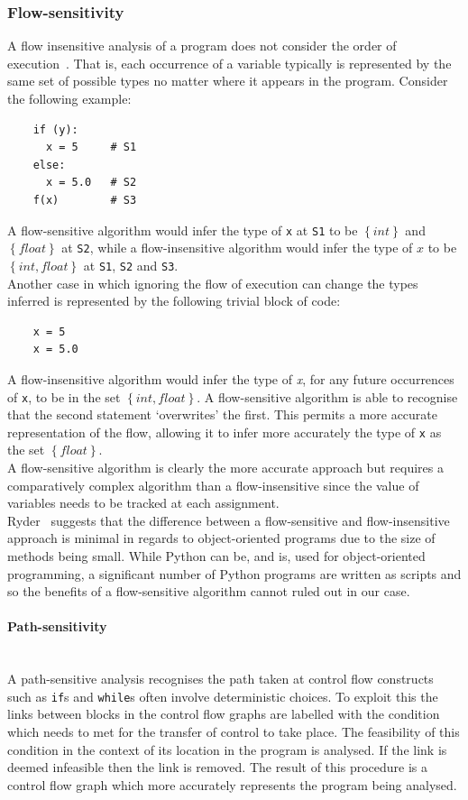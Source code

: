 \documentclass[12pt, titlepage]{article}
\begin{document}
\subsubsection{Flow-sensitivity}
A flow insensitive analysis of a program does not consider the order of execution~\cite{nielson99}. That is, each occurrence of a variable typically is represented by the same set of possible types no matter where it appears in the program. Consider the following example:
\begin{lstlisting}
    if (y):	
      x = 5     # S1
    else:
      x = 5.0   # S2
    f(x)        # S3
\end{lstlisting}
A flow-sensitive algorithm would infer the type of \texttt{x} at \texttt{S1} to be $\left\{ {int}\right\}$ and $\left\{ {float}\right\}$ at \texttt{S2}, while a flow-insensitive algorithm would infer the type of $x$ to be $\left\{ {int, float}\right\}$ at \texttt{S1}, \texttt{S2} and \texttt{S3}. \\
\indent Another case in which ignoring the flow of execution can change the types inferred is represented by the following trivial block of code:
\begin{lstlisting}
    x = 5
    x = 5.0
\end{lstlisting}
A flow-insensitive algorithm would infer the type of \textit{x}, for any future occurrences of \texttt{x}, to be in the set $\left\{ {int, float}\right\}$. A flow-sensitive algorithm is able to recognise that the second statement `overwrites' the first. This permits a more accurate representation of the flow, allowing it to infer more accurately the type of \texttt{x} as the set $\left\{ {float}\right\}$. \\
A flow-sensitive algorithm is clearly the more accurate approach but requires a comparatively complex algorithm than a flow-insensitive since the value of variables needs to be tracked at each assignment. \\
\indent Ryder~\cite{ryder03} suggests that the difference between a flow-sensitive and flow-insensitive approach is minimal in regards to object-oriented programs due to the size of methods being small. While Python can be, and is, used for object-oriented programming, a significant number of Python programs are written as scripts and so the benefits of a flow-sensitive algorithm cannot ruled out in our case.

\paragraph*{Path-sensitivity}\mbox{} \\
A path-sensitive analysis recognises the path taken at control flow constructs such as \texttt{if}s and \texttt{while}s often involve deterministic choices. To exploit this the links between blocks in the control flow graphs are labelled with the condition which needs to met for the transfer of control to take place. The feasibility of this condition in the context of its location in the program is analysed. If the link is deemed infeasible then the link is removed. The result of this procedure is a control flow graph which more accurately represents the program being analysed.
\end{document}
